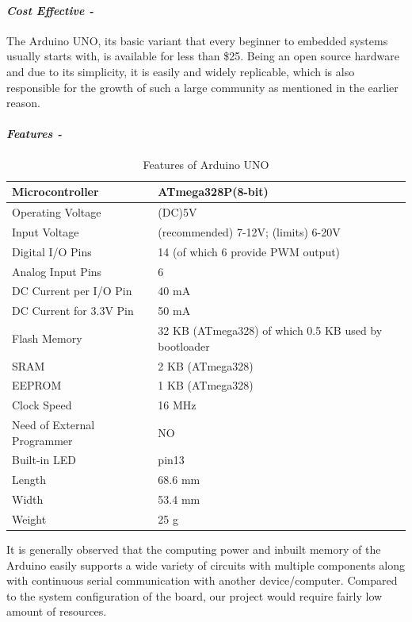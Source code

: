  \paragraph{\textit{Cost Effective -}}
 The Arduino UNO, its basic variant that every beginner to embedded systems usually starts with, is available for less than \$25. Being an open source hardware and due to its simplicity, it is easily and widely replicable, which is also responsible for the growth of such a large community as mentioned in the earlier reason.
 \paragraph{\textit{Features -}} 
 \begin{table}
 \centering
 \begin{tabular}{|l|l|}
 	\hline
 	Microcontroller &ATmega328P(8-bit)\\
 	\hline
 	Operating Voltage &(DC)5V\\
 	\hline
 	Input Voltage  &(recommended) 7-12V; (limits) 6-20V\\
 	\hline
 	Digital I/O Pins &14 (of which 6 provide PWM output)\\
 	\hline
 	Analog Input Pins &6\\
 	\hline
 	DC Current per I/O Pin &40 mA\\
 	\hline
 	DC Current for 3.3V Pin &50 mA\\
 	\hline
 	Flash Memory &32 KB (ATmega328) of which 0.5 KB used by bootloader\\
 	\hline
 	SRAM &2 KB (ATmega328)\\
 	\hline
 	EEPROM &1 KB (ATmega328)\\
 	\hline
 	Clock Speed &16 MHz\\
 	\hline
 	Need of External Programmer &NO\\
 	\hline
 	Built-in LED &pin13\\
 	\hline
 	Length &68.6 mm\\
 	\hline
 	Width &53.4 mm\\
 	\hline
 	Weight &25 g\\
 	\hline
  \end{tabular}
  \caption{Features of Arduino UNO}
  \label{tab:FeaturesArduino}
\end{table}
 It is generally observed that the computing power and inbuilt memory of the Arduino easily supports a wide variety of circuits with multiple components along with continuous serial communication with another device/computer. Compared to the system configuration of the board, our project would require fairly low amount of resources. \vspace{0.1cm} \linebreak 
